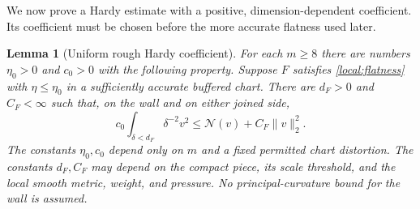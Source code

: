 \documentclass[11pt]{article}
\numberwithin{equation}{section}
\newtheorem{lemma}[theorem]{Lemma}
\theoremstyle{definition}
\theoremstyle{remark}
\begin{document}
We now prove a Hardy estimate with a positive, dimension-dependent
coefficient.  Its coefficient must be chosen before the more accurate
flatness used later.

\begin{lemma}[Uniform rough Hardy coefficient]\label{local:rough}
For each $m\ge8$ there are numbers $\eta_0>0$ and $c_0>0$ with the
following property.  Suppose $F$ satisfies \eqref{local:flatness}
with $\eta\le\eta_0$ in a sufficiently accurate buffered chart.
There are $d_F>0$ and $C_F<\infty$ such that, on the wall and on
either joined side,
\begin{equation}\label{local:rough-estimate}
 c_0\int_{\delta<d_F}\delta^{-2}v^2
             \le\mathcal N(v)+C_F\|v\|_2^2.
\end{equation}
The constants $\eta_0,c_0$ depend only on $m$ and a fixed permitted
chart distortion.  The constants $d_F,C_F$ may depend on the compact
piece, its scale threshold, and the local smooth metric, weight,
and pressure.  No principal-curvature bound for the wall is assumed.
\end{lemma}
\end{document}

